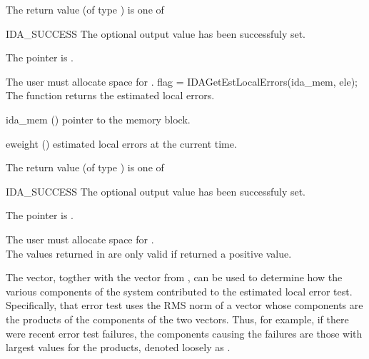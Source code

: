 {{}
{
  The return value  (of type ) is one of
  \begin{args}
  \item[IDA\_SUCCESS] 
    The optional output value has been successfuly set.
  \item[\Id{IDA\_MEM\_NULL}]
    The  pointer is .
  \end{args}
}
{
  {\warn} The user must allocate space for .
}
{
  flag = IDAGetEstLocalErrors(ida\_mem, ele);
}
{
  The function  returns the estimated local errors.
}
{
  \begin{args}
  \item[ida\_mem] ()
    pointer to the {\ida} memory block.
  \item[eweight] ()
    estimated local errors at the current time.
  \end{args}
}
{
  The return value  (of type ) is one of
  \begin{args}
  \item[IDA\_SUCCESS] 
    The optional output value has been successfuly set.
  \item[\Id{IDA\_MEM\_NULL}]
    The  pointer is .
  \end{args}
}
{
  {\warn} The user must allocate space for . \\
  {\warn} The values returned in  are only valid if
   returned a positive value.

  The  vector, togther with the  vector from
  , can be used to determine how the various
  components of the system contributed to the estimated local error
  test.  Specifically, that error test uses the RMS norm of a vector
  whose components are the products of the components of the two vectors.
  Thus, for example, if there were recent error test failures, the components
  causing the failures are those with largest values for the products,
  denoted loosely as .

}}
